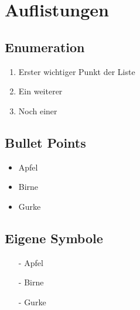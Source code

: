 \chapter{Auflistungen}

\section{Enumeration}

\begin{enumerate}
 \item Erster wichtiger Punkt der Liste
 \item Ein weiterer
 \item Noch einer
\end{enumerate}

\section{Bullet Points}

\begin{itemize}
 \item Apfel
 \item Birne
 \item Gurke
\end{itemize}

\section{Eigene Symbole}

\begin{itemize}
  \item[-] Apfel
  \item[-] Birne
  \item[-] Gurke
\end{itemize}
